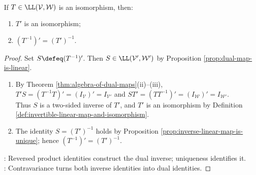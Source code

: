 \begin{corollary} \label{cor:dual-map-inverse} \\
If $T\in\LL(\mathcal{V},\mathcal{W})$ is an isomorphism, then:
\begin{enumerate}[label=(\roman*)]
\setlength{\itemsep}{0pt}
\item $T'$ is an isomorphism;
\item $(T^{-1})'=(T')^{-1}$.
\end{enumerate}
\begin{proof}
Set $S\defeq(T^{-1})'$. Then $S\in\LL(\mathcal{V}',\mathcal{W}')$ by Proposition \ref{prop:dual-map-is-linear}.
\begin{enumerate}[label=(\roman*)]
\setlength{\itemsep}{0pt}
\item By Theorem \ref{thm:algebra-of-dual-maps}(ii)--(iii), $T'S=(T^{-1}T)'=(I_{\mathcal{V}})'=I_{\mathcal{V}'}$ and $ST'=(TT^{-1})'=(I_{\mathcal{W}})'=I_{\mathcal{W}'}$.\\
Thus $S$ is a two-sided inverse of $T'$, and $T'$ is an isomorphism by Definition \ref{def:invertible-linear-map-and-isomorphism}.
\item The identity $S=(T')^{-1}$ holds by Proposition \ref{prop:inverse-linear-map-is-unique}; hence $(T^{-1})'=(T')^{-1}$.
\end{enumerate}
: Reversed product identities construct the dual inverse; uniqueness identifies it.\\
: Contravariance turns both inverse identities into dual identities.
\end{proof}
\end{corollary}

